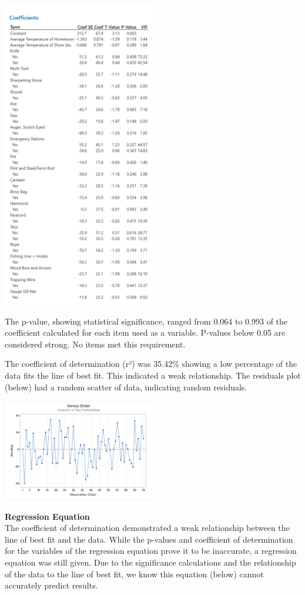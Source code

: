 \documentclass[letterpaper,twoside,11pt,twocolumn]{article}
\begin{document}
\noindent\includegraphics[width=0.5\textwidth]{./img1.png}

The p-value, showing statistical significance, ranged from 0.064 to 0.993 of the coefficient calculated for each item used as a variable. P-values below 0.05 are considered strong. No items met this requirement. 

The coefficient of determination (r²) was 35.42\% showing a low percentage of the data fits the line of best fit. This indicated a weak relationship. The residuals plot (below) had a random scatter of data, indicating random residuals.

\noindent\includegraphics[width=0.5\textwidth]{./img2.png}

\noindent\textbf{Regression Equation}\\
The coefficient of determination demonstrated a weak relationship between the line of best fit and the data. While the p-values and coefficient of determination for the variables of the regression equation prove it to be inaccurate, a regression equation was still given. Due to the significance calculations and the relationship of the data to the line of best fit, we know this equation (below) cannot accurately predict results.
\end{document}
